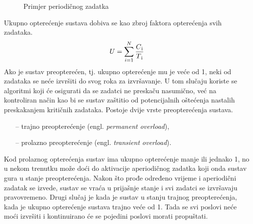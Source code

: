 \documentclass[../zavrsni.tex]{subfiles}
\begin{document}
\begin{figure}[h]
    \centering

    \begin{RTGrid}[width=13cm]{1}{8}

  

    \end{RTGrid}

    \caption{Primjer periodičnog zadatka}
    \label{fig:ex1}
  \end{figure}

Ukupno opterećenje sustava dobiva se kao zbroj faktora opterećenja svih zadataka. 
\begin{equation*}
    U = \sum_{i=1}^{N}\frac{C\textsubscript{i}}{T\textsubscript{i}}
\end{equation*}
Ako je sustav preopterećen, tj. ukupno opterećenje mu 
je veće od 1, neki od zadataka se neće izvršiti do svog roka za izvršavanje. U tom slučaju koriste se algoritmi koji će osigurati 
da se zadatci ne preskaču nasumično, već na kontroliran način kao bi se sustav zaštitio od potencijalnih oštećenja nastalih preskakanjem 
kritičnih zadataka. Postoje dvije vrste preopterećenja sustava.
\begin{itemize}
    \item[--] trajno preopterećenje (engl. \textit{permanent overload}),
    \item[--] prolazno preopterećenje (engl. \textit{transient overload}).
\end{itemize}
Kod prolaznog opterećenja sustav ima ukupno opterećenje manje ili jednako 1, no u nekom trenutku može doći do aktivacije aperiodičnog zadatka 
koji onda sustav gura u stanje preopterećenja. Nakon što prođe određeno vrijeme i aperiodični zadatak se izvede, sustav se vraća u prijašnje
stanje i svi zadatci se izvršavaju pravovremeno. Drugi slučaj je kada je sustav u stanju trajnog preopterećenja, kada je ukupno 
opterećenje sustava trajno veće od 1. Tada se svi poslovi neće moći izvršiti i kontinuirano će se pojedini poslovi morati propuštati. 

\end{document}
